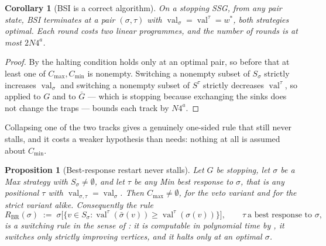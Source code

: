 \documentclass[11pt]{article}
\theoremstyle{plain}
\newtheorem{proposition}[theorem]{Proposition}
\newtheorem{corollary}[theorem]{Corollary}
\theoremstyle{definition}
\DeclareMathOperator{\val}{val}
\begin{document}
\begin{corollary}[BSI is a correct algorithm]\label{cor:bsi-correct}
On a stopping SSG, from any pair state, BSI terminates at a pair
$(\sigma,\tau)$ with $\val_\sigma=\val^\tau=w^\ast$, both strategies
optimal. Each round costs two linear programmes, and the number of rounds
is at most $2N4^{a}$.
\end{corollary}

\begin{proof}
By  the halting condition holds only at an optimal
pair, so before that at least one of $C_{\max},C_{\min}$ is nonempty.
Switching a nonempty subset of $S_\sigma$ strictly increases $\val_\sigma$
and switching a nonempty subset of $S^\tau$ strictly decreases $\val^\tau$,
so  applied to $G$ and to $\bar G$ --- which is
stopping because exchanging the sinks does not change the traps --- bounds
each track by $N4^{a}$.
\end{proof}

Collapsing one of the two tracks gives a genuinely one-sided rule that
still never stalls, and it costs a weaker hypothesis than
 needs: nothing at all is assumed about
$C_{\min}$.

\begin{proposition}[Best-response restart never stalls]\label{prop:bsi-br}
Let $G$ be stopping, let $\sigma$ be a Max strategy with
$S_\sigma\ne\emptyset$, and let $\tau$ be \emph{any} Min best response to
$\sigma$, that is any positional $\tau$ with
$\val_{\sigma,\tau}=\val_\sigma$. Then $C_{\max}\ne\emptyset$, for the
veto variant and for the strict variant alike. Consequently the rule
\[
  R_{\mathrm{BR}}(\sigma)\;:=\;\sigma\bigl[\{v\in S_\sigma:
    \val^\tau(\bar\sigma(v))\ge\val^\tau(\sigma(v))\}\bigr],
  \qquad\tau\ \text{a best response to }\sigma,
\]
is a switching rule in the sense of : it is computable in
polynomial time by , it switches only strictly
improving vertices, and it halts only at an optimal $\sigma$.
\end{proposition}
\end{document}
